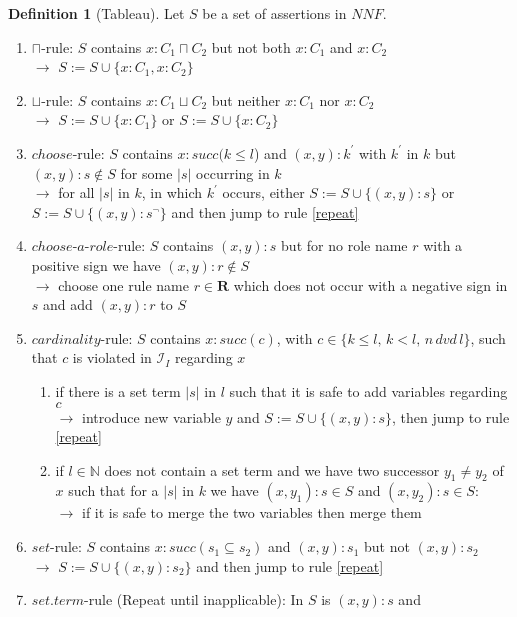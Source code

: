 \documentclass[a4paper,11pt]{scrartcl}
\theoremstyle{break}
\theoremstyle{definition}
\newtheorem{mydef}{Definition}
\begin{document}
\begin{mydef}[Tableau]
Let $S$ be a set of assertions in $NNF$.
\begin{enumerate}
\item\label{cap} $\sqcap$-rule: $S$ contains $x:C_1\sqcap C_2$ but not both $x:C_1$ and $x:C_2$\\
$\rightarrow$ $S:=S\cup\{x:C_1, x:C_2\}$
\item\label{cup} $\sqcup$-rule: $S$ contains $x:C_1\sqcup C_2$ but neither $x:C_1$ nor $x:C_2$\\
$\rightarrow$ $S:=S\cup\{x:C_1\}$ or $S:=S\cup\{x:C_2\}$
\item\label{choose}$choose$-rule: $S$ contains
$x:succ(k\leq l$) and $(x,y):k^\prime$ with $k^\prime$ in $k$ but $(x,y):s\not\in S$ for some $|s|$ occurring in $k$\\
$\rightarrow$ for all $|s|$ in $k$, in which $k^\prime$ occurs, either $S:=S\cup\{(x,y):s\}$ or $S:=S\cup\{(x,y):s^\neg\}$ and then jump to rule \ref{repeat}
\item\label{chooserole}$choose$-$a$-$role$-rule: $S$ contains $(x,y):s$ but for no role name $r$ with a positive sign we have $(x,y):r\notin S$\\
$\rightarrow$ choose one rule name $r\in\mathbf{R}$ which does not occur with a negative sign in $s$ and add $(x,y):r$ to $S$
\item\label{c}$cardinality$-rule: $S$ contains $x:succ(c)$, with $c\in\{k\leq l,\,k<l,\, n\, dvd\,l\}$, such that $c$ is violated in $\mathcal{I}_I$ regarding $x$
\begin{enumerate}
\item \label{setterm} if there is a set term $|s|$ in $l$ such that it is safe to add variables regarding $c$\\
$\rightarrow$ introduce new variable $y$ and $S:=S\cup\{(x,y):s\}$, then jump to rule \ref{repeat}
\item \label{exceeded} if $l\in \mathbb{N}$ does not contain a set term and we have two successor $y_1\neq y_2$ of $x$ such that for a $|s|$ in $k$ we have $(x,y_1):s\in S$ and $(x,y_2):s\in S$:\\
$\rightarrow$ if it is safe to merge the two variables then merge them
\end{enumerate}
\item\label{s}$set$-rule: $S$ contains $x:succ(s_1\subseteq s_2)$ and $(x,y):s_1$ but not $(x,y):s_2$\\
$\rightarrow$ $S:=S\cup\{(x,y):s_2\}$ and then jump to rule \ref{repeat}
\item\label{repeat} $set.term$-rule (Repeat until inapplicable): In $S$ is $(x,y):s$ and

\end{enumerate}
\end{mydef}
\end{document}
